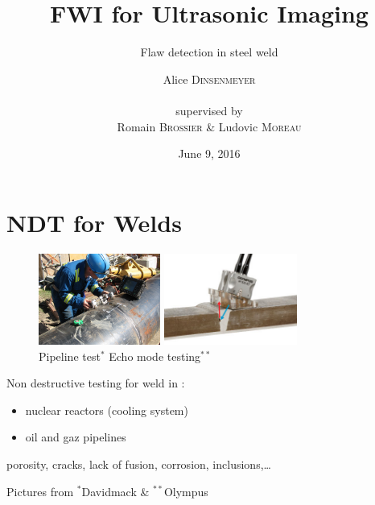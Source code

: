 \documentclass[11pt,xcolor=x11names,compress, notes=show]{beamer}%
\author{Alice \textsc{Dinsenmeyer} \\~\\ supervised by \\ Romain \textsc{Brossier} \& Ludovic \textsc{Moreau}}
\title{FWI for Ultrasonic Imaging}
\subtitle{Flaw detection in steel weld}
\date{\small June 9, 2016}
\begin{document}
\begin{frame}
	\titlepage 
\end{frame}


\section*{NDT for Welds}
\begin{frame}{\insertsectionhead}
\vspace{-0.7cm}
	\begin{figure}
		\centering
		\includegraphics[height=3cm]{img/us_test.jpg}
		\hspace{1cm}
		\includegraphics[height=3cm]{img/olympus.jpg}\\
		{\tiny Pipeline test$^{*}$\hspace{4cm} Echo mode testing$^{**}$}
	\end{figure}

			Non destructive testing for weld in :\\
			\begin{itemize}
				\item nuclear reactors (cooling system)
				\item oil and gaz pipelines
			\end{itemize}
			\vspace{0.6cm}
 			\indent {} porosity, cracks, lack of fusion, corrosion, inclusions,\ldots


	
\vfill
{\tiny Pictures from $^{*}$Davidmack \& $^{**}$Olympus}\vspace{-0.5cm}
\end{frame}
\end{document}
